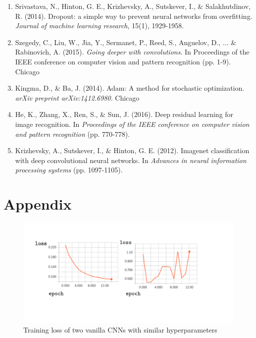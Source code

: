 \documentclass{article}
\begin{document}
\begin{enumerate}
\item Srivastava, N., Hinton, G. E., Krizhevsky, A., Sutskever, I., \& Salakhutdinov, R. (2014). Dropout: a simple way to prevent neural networks from overfitting. \emph{Journal of machine learning research}, 15(1), 1929-1958.
\item Szegedy, C., Liu, W., Jia, Y., Sermanet, P., Reed, S., Anguelov, D., ... \& Rabinovich, A. (2015). \emph{Going deeper with convolutions}. In Proceedings of the IEEE conference on computer vision and pattern recognition (pp. 1-9).
Chicago
\item Kingma, D., \& Ba, J. (2014). Adam: A method for stochastic optimization. \emph{arXiv preprint arXiv:1412.6980}.
Chicago	
\item He, K., Zhang, X., Ren, S., \& Sun, J. (2016). Deep residual learning for image recognition. In \emph{Proceedings of the IEEE conference on computer vision and pattern recognition} (pp. 770-778).
\item Krizhevsky, A., Sutskever, I., \& Hinton, G. E. (2012). Imagenet classification with deep convolutional neural networks. In \emph{Advances in neural information processing systems} (pp. 1097-1105).


\end{enumerate}
\pagebreak
\section*{Appendix}

\begin{figure}[h]
  \includegraphics[width=\linewidth]{loss.pdf}
  \caption{Training loss of two vanilla CNNs with similar hyperparameters}
  \label{fig:loss}
\end{figure}
\end{document}
